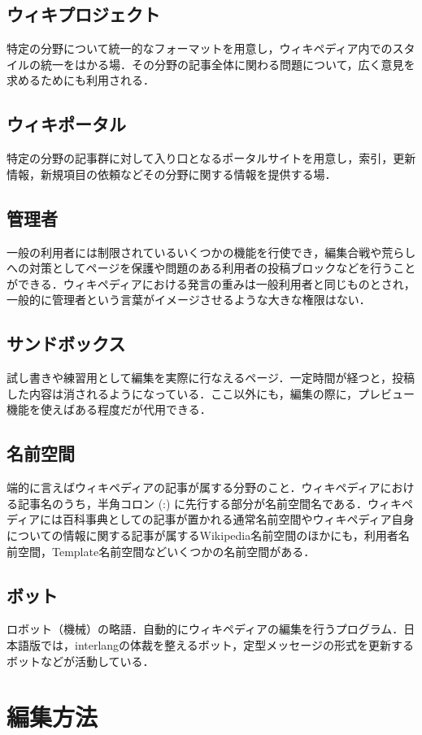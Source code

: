 \subsection{ウィキプロジェクト}
特定の分野について統一的なフォーマットを用意し，ウィキペディア内でのスタイルの統一をはかる場．その分野の記事全体に関わる問題について，広く意見を求めるためにも利用される．
\subsection{ウィキポータル}
特定の分野の記事群に対して入り口となるポータルサイトを用意し，索引，更新情報，新規項目の依頼などその分野に関する情報を提供する場．
\subsection{管理者}
一般の利用者には制限されているいくつかの機能を行使でき，編集合戦や荒らしへの対策としてページを保護や問題のある利用者の投稿ブロックなどを行うことができる．ウィキペディアにおける発言の重みは一般利用者と同じものとされ，一般的に管理者という言葉がイメージさせるような大きな権限はない．
\subsection{サンドボックス}
試し書きや練習用として編集を実際に行なえるページ．一定時間が経つと，投稿した内容は消されるようになっている．ここ以外にも，編集の際に，プレビュー機能を使えばある程度だが代用できる．
\subsection{名前空間}
 端的に言えばウィキペディアの記事が属する分野のこと．ウィキペディアにおける記事名のうち，半角コロン (:) に先行する部分が名前空間名である．ウィキペディアには百科事典としての記事が置かれる通常名前空間やウィキペディア自身についての情報に関する記事が属するWikipedia名前空間のほかにも，利用者名前空間，Template名前空間などいくつかの名前空間がある．
\subsection{ボット}
ロボット（機械）の略語．自動的にウィキペディアの編集を行うプログラム．日本語版では，interlangの体裁を整えるボット，定型メッセージの形式を更新するボットなどが活動している．

\section{編集方法}

